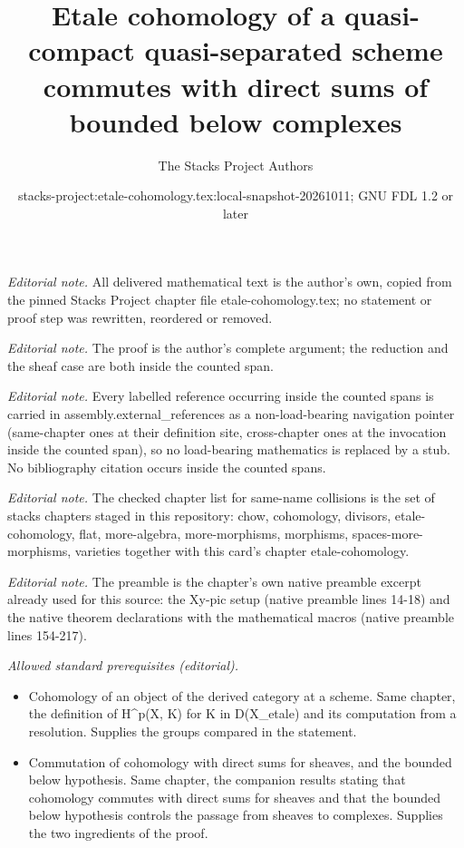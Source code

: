\documentclass[10pt,a4paper]{amsart}
\title{Etale cohomology of a quasi-compact quasi-separated scheme commutes with direct sums of bounded below complexes}
\author{The Stacks Project Authors}
\date{stacks-project:etale-cohomology.tex:local-snapshot-20261011; GNU FDL 1.2 or later}
\theoremstyle{plain}
\theoremstyle{definition}
\theoremstyle{remark}
\numberwithin{equation}{subsection}
\begin{document}
\maketitle
\noindent\textit{Editorial note.} All delivered mathematical text is the author's own, copied from the pinned Stacks Project chapter file etale-cohomology.tex; no statement or proof step was rewritten, reordered or removed.\par\medskip
\noindent\textit{Editorial note.} The proof is the author's complete argument; the reduction and the sheaf case are both inside the counted span.\par\medskip
\noindent\textit{Editorial note.} Every labelled reference occurring inside the counted spans is carried in assembly.external\_references as a non-load-bearing navigation pointer (same-chapter ones at their definition site, cross-chapter ones at the invocation inside the counted span), so no load-bearing mathematics is replaced by a stub. No bibliography citation occurs inside the counted spans.\par\medskip
\noindent\textit{Editorial note.} The checked chapter list for same-name collisions is the set of stacks chapters staged in this repository: chow, cohomology, divisors, etale-cohomology, flat, more-algebra, more-morphisms, morphisms, spaces-more-morphisms, varieties together with this card's chapter etale-cohomology.\par\medskip
\noindent\textit{Editorial note.} The preamble is the chapter's own native preamble excerpt already used for this source: the Xy-pic setup (native preamble lines 14-18) and the native theorem declarations with the mathematical macros (native preamble lines 154-217).\par\medskip
\noindent\textit{Allowed standard prerequisites (editorial).}\begin{itemize}
\item Cohomology of an object of the derived category at a scheme. Same chapter, the definition of H\textasciicircum{}p(X, K) for K in D(X\_etale) and its computation from a resolution. Supplies the groups compared in the statement.
\item Commutation of cohomology with direct sums for sheaves, and the bounded below hypothesis. Same chapter, the companion results stating that cohomology commutes with direct sums for sheaves and that the bounded below hypothesis controls the passage from sheaves to complexes. Supplies the two ingredients of the proof.
\end{itemize}\medskip
\end{document}
